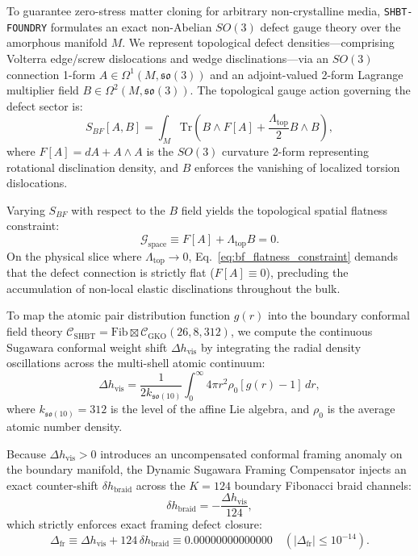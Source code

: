 \documentclass[11pt,onecolumn]{article}
\begin{document}
To guarantee zero-stress matter cloning for arbitrary non-crystalline media, \texttt{SHBT-FOUNDRY} formulates an exact non-Abelian $SO(3)$ defect gauge theory over the amorphous manifold $M$. We represent topological defect densities---comprising Volterra edge/screw dislocations and wedge disclinations---via an $SO(3)$ connection 1-form $A \in \Omega^1(M, \mathfrak{so}(3))$ and an adjoint-valued 2-form Lagrange multiplier field $B \in \Omega^2(M, \mathfrak{so}(3))$. The topological gauge action governing the defect sector is:
\begin{equation}
S_{BF}[A, B] = \int_M \text{Tr}\left( B \wedge F[A] + \frac{\Lambda_{\text{top}}}{2} B \wedge B \right),
\label{eq:bf_topological_action}
\end{equation}
where $F[A] = dA + A \wedge A$ is the $SO(3)$ curvature 2-form representing rotational disclination density, and $B$ enforces the vanishing of localized torsion dislocations.

Varying $S_{BF}$ with respect to the $B$ field yields the topological spatial flatness constraint:
\begin{equation}
\mathcal{G}_{\text{space}} \equiv F[A] + \Lambda_{\text{top}} B = 0.
\label{eq:bf_flatness_constraint}
\end{equation}
On the physical slice where $\Lambda_{\text{top}} \to 0$, Eq.~\eqref{eq:bf_flatness_constraint} demands that the defect connection is strictly flat ($F[A] \equiv 0$), precluding the accumulation of non-local elastic disclinations throughout the bulk.

To map the atomic pair distribution function $g(r)$ into the boundary conformal field theory $\mathcal{C}_{\text{SHBT}} = \text{Fib} \boxtimes \mathcal{C}_{\text{GKO}}(26, 8, 312)$, we compute the continuous Sugawara conformal weight shift $\Delta h_{\text{vis}}$ by integrating the radial density oscillations across the multi-shell atomic continuum:
\begin{equation}
\Delta h_{\text{vis}} = \frac{1}{2 k_{\mathfrak{so}(10)}} \int_0^\infty 4\pi r^2 \rho_0 \left[ g(r) - 1 \right] \, dr,
\label{eq:continuous_sugawara_shift}
\end{equation}
where $k_{\mathfrak{so}(10)} = 312$ is the level of the affine Lie algebra, and $\rho_0$ is the average atomic number density.

Because $\Delta h_{\text{vis}} > 0$ introduces an uncompensated conformal framing anomaly on the boundary manifold, the Dynamic Sugawara Framing Compensator injects an exact counter-shift $\delta h_{\text{braid}}$ across the $K = 124$ boundary Fibonacci braid channels:
\begin{equation}
\delta h_{\text{braid}} = -\frac{\Delta h_{\text{vis}}}{124},
\label{eq:braid_framing_counter_shift}
\end{equation}
which strictly enforces exact framing defect closure:
\begin{equation}
\Delta_{\text{fr}} \equiv \Delta h_{\text{vis}} + 124 \, \delta h_{\text{braid}} \equiv 0.00000000000000 \quad (|\Delta_{\text{fr}}| \le 10^{-14}).
\label{eq:exact_framing_closure}
\end{equation}
\end{document}
